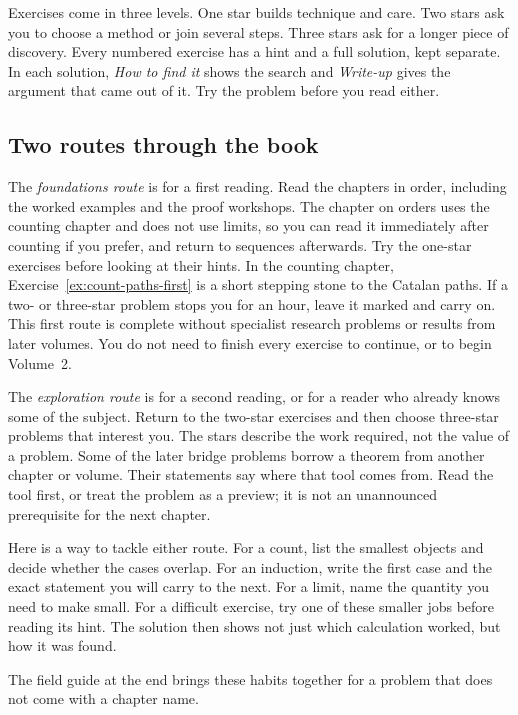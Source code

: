 Exercises come in three levels. One star builds technique and care. Two stars ask you to choose a method or join several steps. Three stars ask for a longer piece of discovery. Every numbered exercise has a hint and a full solution, kept separate. In each solution, \emph{How to find it} shows the search and \emph{Write-up} gives the argument that came out of it. Try the problem before you read either.

\subsection*{Two routes through the book}

The \emph{foundations route} is for a first reading. Read the chapters in order, including the worked examples and the proof workshops. The chapter on orders uses the counting chapter and does not use limits, so you can read it immediately after counting if you prefer, and return to sequences afterwards. Try the one-star exercises before looking at their hints. In the counting chapter, Exercise~\ref{ex:count-paths-first} is a short stepping stone to the Catalan paths. If a two- or three-star problem stops you for an hour, leave it marked and carry on. This first route is complete without specialist research problems or results from later volumes. You do not need to finish every exercise to continue, or to begin Volume~2.

The \emph{exploration route} is for a second reading, or for a reader who already knows some of the subject. Return to the two-star exercises and then choose three-star problems that interest you. The stars describe the work required, not the value of a problem. Some of the later bridge problems borrow a theorem from another chapter or volume. Their statements say where that tool comes from. Read the tool first, or treat the problem as a preview; it is not an unannounced prerequisite for the next chapter.

Here is a way to tackle either route. For a count, list the smallest objects and decide whether the cases overlap. For an induction, write the first case and the exact statement you will carry to the next. For a limit, name the quantity you need to make small. For a difficult exercise, try one of these smaller jobs before reading its hint. The solution then shows not just which calculation worked, but how it was found.

The field guide at the end brings these habits together for a problem that does not come with a chapter name.

